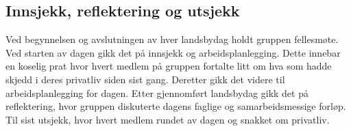 \subsection{Innsjekk, reflektering og utsjekk}

Ved begynnelsen og avslutningen av hver landsbydag holdt gruppen fellesmøte. Ved starten av dagen gikk det på innsjekk og arbeidsplanlegging. Dette innebar en koselig prat hvor hvert medlem på gruppen fortalte litt om hva som hadde skjedd i deres privatliv siden sist gang. Deretter gikk det videre til arbeidsplanlegging for dagen. Etter gjennomført landsbydag gikk det på reflektering, hvor gruppen diskuterte dagens faglige og samarbeidsmessige forløp. Til sist utsjekk, hvor hvert medlem rundet av dagen og snakket om privatliv. 